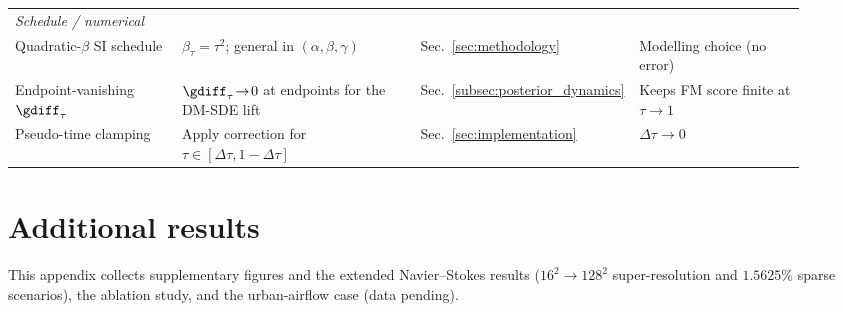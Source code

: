 \begin{table}[ht]
\begin{tabular}{p{0.21\linewidth} p{0.30\linewidth} p{0.20\linewidth} p{0.21\linewidth}}
        \midrule
        \multicolumn{4}{l}{\emph{Schedule / numerical}}\\
        Quadratic-$\beta$ SI schedule & $\beta_\tau=\tau^2$; general in $(\alpha,\beta,\gamma)$ & Sec.~\ref{sec:methodology} & Modelling choice (no error) \\
        Endpoint-vanishing $\gdiff_\tau$ & $\gdiff_\tau\!\to\!0$ at endpoints for the DM-SDE lift & Sec.~\ref{subsec:posterior_dynamics} & Keeps FM score finite at $\tau\to1$ \\
        Pseudo-time clamping & Apply correction for $\tau\in[\Delta\tau,1-\Delta\tau]$ & Sec.~\ref{sec:implementation} & $\Delta\tau\to0$ \\
        \bottomrule
    \end{tabular}
\end{table}

\section{Additional results}\label{appendix:additional_results}

This appendix collects supplementary figures and the extended Navier--Stokes results ($16^2\!\to\!128^2$ super-resolution and $1.5625\%$ sparse scenarios), the ablation study, and the urban-airflow case (data pending).

